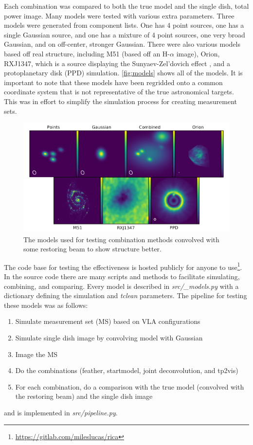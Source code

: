 \documentclass[manuscript,linenumbers]{aastex62}
\begin{document}
Each combination was compared to both the true model and the single dish, total power image. Many models were tested with various extra parameters. Three models were generated from component lists. One has 4 point sources, one has a single Gaussian source, and one has a mixture of 4 point sources, one very broad Gaussian, and on off-center, stronger Gaussian. There were also various models based off real structure, including M51 (based off an H-$\alpha$ image), Orion, RXJ1347, which is a source displaying the Sunyaev-Zel'dovich effect \citep{2016PASJ...68...88K}, and a protoplanetary disk (PPD) simulation. \autoref{fig:models} shows all of the models. It is important to note that these models have been regridded onto a common coordinate system that is not representative of the true astronomical targets. This was in effort to simplify the simulation process for creating measurement sets. 

\begin{figure}[t]
    \includegraphics[width=\textwidth]{figures/models}
    \caption{The models used for testing combination methods convolved with some restoring beam to show structure better.}
    \label{fig:models}
\end{figure}

The code base for testing the effectiveness is hosted publicly for anyone to use\footnote{\url{https://gitlab.com/mileslucas/rica}}. In the source code there are many scripts and methods to facilitate simulating, combining, and comparing. Every model is described in \textit{src/\_models.py} with a dictionary defining the simulation and \textit{tclean} parameters. The pipeline for testing these models was as follows:
\begin{enumerate}
    \item Simulate measurement set (MS) based on VLA configurations
    \item Simulate single dish image by convolving model with Gaussian
    \item Image the MS 
    \item Do the combinations (feather, startmodel, joint deconvolution, and tp2vis)
    \item For each combination, do a comparison with the true model (convolved with the restoring beam) and the single dish image
\end{enumerate}
and is implemented in \textit{src/pipeline.py}. 
\end{document}
